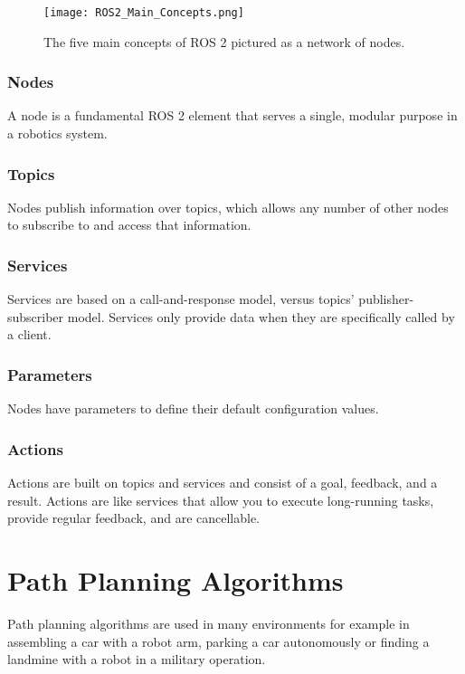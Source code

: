 \begin{figure}[H]
    \centering
    \texttt{[image: ROS2\_Main\_Concepts.png]}
    \caption{The five main concepts of ROS 2 pictured as a network of nodes.}
    \label{fig:ROS 2 main concepts}
\end{figure}

\subsubsection{Nodes}
A node is a fundamental ROS 2 element that serves a single, modular purpose in a robotics system. %

\subsubsection{Topics}
 Nodes publish information over topics, which allows any number of other nodes to subscribe to and access that information. %

\subsubsection{Services}
Services are based on a call-and-response model, versus topics’ publisher-subscriber model. Services only provide data when they are specifically called by a client. %

\subsubsection{Parameters}
Nodes have parameters to define their default configuration values. %

\subsubsection{Actions}
Actions are built on topics and services and consist of a goal, feedback, and a result. Actions are like services that allow you to execute long-running tasks, provide regular feedback, and are cancellable. %

\section{Path Planning Algorithms}
Path planning algorithms are used in many environments for example in assembling a car with a robot arm, parking a car autonomously or finding a landmine with a robot in a military operation. 


